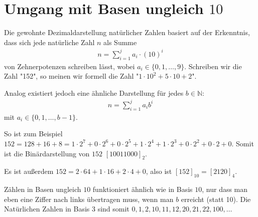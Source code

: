 \documentclass{report}
\newcommand*{\newpar}{\par\vspace{\baselineskip}\noindent}
\newcommand{\bN}{\mathbb{N}}
\begin{document}
	\newtheorem{lemma}{Lemma}[chapter]
	\newtheorem{theorem}[lemma]{Satz}
	\newtheorem{proposition}[lemma]{Proposition}
	\newtheorem{corollary}[lemma]{Korollar}
	\newtheorem{application}[lemma]{Anwendung}
	
	\theoremstyle{definition}
	\newtheorem{definition}[lemma]{Definition}
	\newtheorem{example}[lemma]{Beispiel}

	
	\tableofcontents
	\thispagestyle{fancy}
	\chapter{Umgang mit Basen ungleich $10$}
	Die gewohnte Dezimaldarstellung natürlicher Zahlen basiert auf der Erkenntnis, dass sich jede natürliche Zahl $n$ als Summe
	\begin{align*}
		n = \sum_{i = 1}^j a_i \cdot (10)^i
	\end{align*}
	von Zehnerpotenzen schreiben lässt, wobei $a_i \in \{0,1,\hdots,9\}$.
	Schreiben wir die Zahl "152", so meinen wir formell die Zahl "$1 \cdot 10^2 + 5 \cdot 10 + 2$".
	\newpar
	Analog existiert jedoch eine ähnliche Darstellung für jedes $b \in \bN$:
	\begin{align*}
		n = \sum_{i = 1}^j a_i b^i
	\end{align*}
	mit $a_i \in \{0, 1, \hdots, b-1\}$.
	\newpar
	So ist zum Beispiel $152 = 128 + 16 + 8 = 1 \cdot 2^7 + 0 \cdot 2^6 + 0 \cdot 2^5 + 1 \cdot 2^4 + 1 \cdot 2^3 + 0 \cdot 2^2 + 0 \cdot 2 + 0$. Somit ist die Binärdarstellung von $152$ $[10011000]_2$.
	\newpar
	Es ist außerdem $152 = 2 \cdot 64 + 1 \cdot 16 + 2 \cdot 4 + 0$, also ist $[152]_{10} = [2120]_4$.
	\newpar
	Zählen in Basen ungleich $10$ funktioniert ähnlich wie in Basis $10$, nur dass man eben eine Ziffer nach links übertragen muss, wenn man $b$ erreicht (statt 10). Die Natürlichen Zahlen in Basis $3$ sind somit $0,1,2,10,11,12,20,21,22,100,\hdots$
\end{document}
